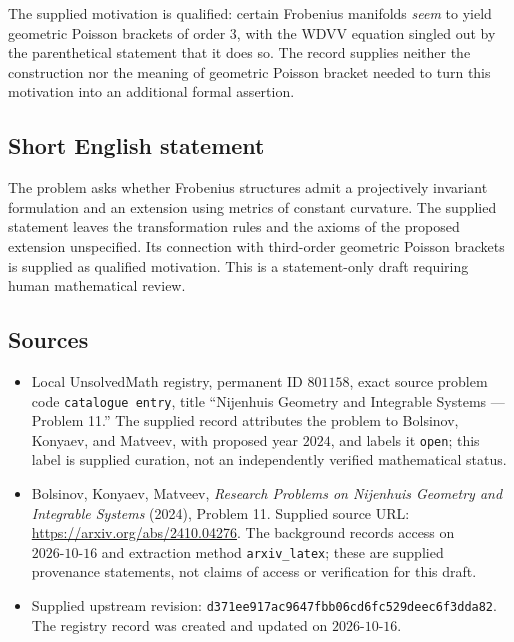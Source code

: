 \documentclass[11pt]{article}
\begin{document}
The supplied motivation is qualified: certain Frobenius manifolds \emph{seem} to yield geometric Poisson brackets of order \(3\), with the WDVV equation singled out by the parenthetical statement that it does so. The record supplies neither the construction nor the meaning of geometric Poisson bracket needed to turn this motivation into an additional formal assertion.
\subsection{Short English statement}
The problem asks whether Frobenius structures admit a projectively invariant formulation and an extension using metrics of constant curvature. The supplied statement leaves the transformation rules and the axioms of the proposed extension unspecified. Its connection with third-order geometric Poisson brackets is supplied as qualified motivation. This is a statement-only draft requiring human mathematical review.
\subsection{Sources}
\begin{itemize}
\item Local UnsolvedMath registry, permanent ID \(801158\), exact source problem code \texttt{catalogue entry}, title ``Nijenhuis Geometry and Integrable Systems --- Problem 11.'' The supplied record attributes the problem to Bolsinov, Konyaev, and Matveev, with proposed year \(2024\), and labels it \texttt{open}; this label is supplied curation, not an independently verified mathematical status.
\item Bolsinov, Konyaev, Matveev, \emph{Research Problems on Nijenhuis Geometry and Integrable Systems} (2024), Problem 11. Supplied source URL: \url{https://arxiv.org/abs/2410.04276}. The background records access on \(2026\text{-}10\text{-}16\) and extraction method \texttt{arxiv\_latex}; these are supplied provenance statements, not claims of access or verification for this draft.
\item Supplied upstream revision: \texttt{d371ee917ac9647fbb06cd6fc529deec6f3dda82}. The registry record was created and updated on \(2026\text{-}10\text{-}16\).
\end{itemize}
\end{document}
